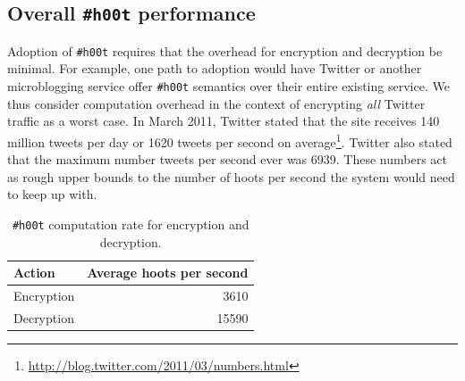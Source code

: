 \documentclass{sig-alternate-arxiv}
\newcommand{\hoot}{{\tt \#h00t}\xspace}
\begin{document}
%

\subsection{Overall \hoot performance}

Adoption of \hoot requires that the overhead for encryption and
decryption be minimal. For example, one path to adoption would have
Twitter or another microblogging service offer \hoot semantics over
their entire existing service. We thus consider computation overhead in
the context of encrypting {\em all} Twitter traffic as a worst case. In
March 2011, Twitter stated that the site receives 140 million tweets per
day or 1620 tweets per second on
average\footnote{\url{http://blog.twitter.com/2011/03/numbers.html}}. Twitter
also stated that the maximum number tweets per second ever was
6939. These numbers act as rough upper bounds to the number of hoots per
second the system would need to keep up with.

\begin{table}
\caption{\hoot computation rate for encryption and
  decryption.\label{tab:hps}}
\begin{center}
    \begin{tabular}{ l  r }
	Action & Average hoots per second \\ \hline
	Encryption & 3610 \\
	Decryption & 15590 
    \end{tabular}
\end{center}
\end{table}
\end{document}
